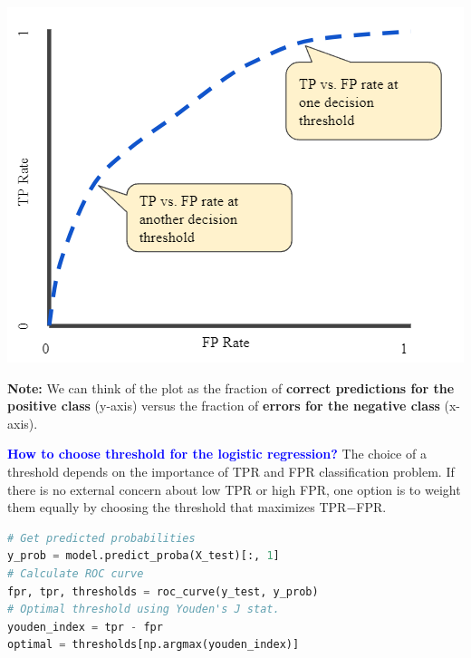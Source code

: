 \documentclass[letterpaper, 10.5pt,landscape]{article}
\begin{document}
\begin{multicols*}{3}
\begin{center}
    \begin{minipage}{0.75\linewidth}
        \includegraphics[width=\textwidth]{figures/ROC_curve.PNG}
    \end{minipage}
\end{center}

\vspace{-5pt}

\textbf{Note:} We can think of the plot as the fraction of \textbf{correct predictions for the positive class} (y-axis) versus the fraction of \textbf{errors for the negative class} (x-axis).

\vspace{2pt}

\textbf{\textcolor{blue}{How to choose threshold for the logistic regression?}}
The choice of a threshold depends on the importance of TPR and FPR classification problem. If there is no external concern about low TPR or high FPR, one option is to weight them equally by choosing the threshold that maximizes TPR$-$FPR.
\begin{lstlisting}[language=Python, mathescape=true, frame=single]
# Get predicted probabilities
y_prob = model.predict_proba(X_test)[:, 1] 
# Calculate ROC curve
fpr, tpr, thresholds = roc_curve(y_test, y_prob)
# Optimal threshold using Youden's J stat.
youden_index = tpr - fpr
optimal = thresholds[np.argmax(youden_index)]
\end{lstlisting}


\vspace{3pt}


\end{multicols*}
\end{document}
